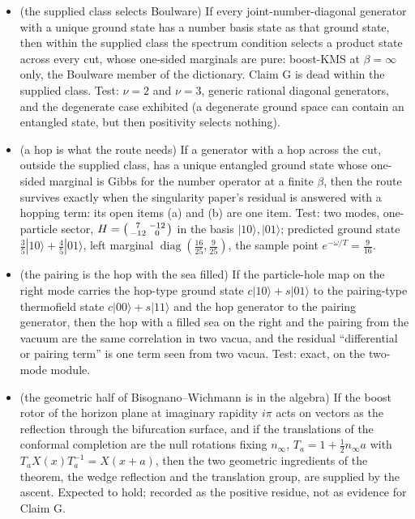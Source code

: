 \documentclass[11pt]{article}
\theoremstyle{definition}
\theoremstyle{plain}
\providecommand{\nInf}{}\renewcommand{\nInf}{n_\infty}
\providecommand{\ket}{}\renewcommand{\ket}[1]{|#1\rangle}
\begin{document}
\begin{itemize}
\item[K1] (the supplied class selects Boulware) If every joint-number-diagonal generator with a unique ground state has a number basis state as that ground state, then within the supplied class the spectrum condition selects a product state across every cut, whose one-sided marginals are pure: boost-KMS at $\beta = \infty$ only, the Boulware member of the dictionary. Claim G is dead within the supplied class. Test: $\nu = 2$ and $\nu = 3$, generic rational diagonal generators, and the degenerate case exhibited (a degenerate ground space can contain an entangled state, but then positivity selects nothing).
\item[K2] (a hop is what the route needs) If a generator with a hop across the cut, outside the supplied class, has a unique entangled ground state whose one-sided marginal is Gibbs for the number operator at a finite $\beta$, then the route survives exactly when the singularity paper's residual is answered with a hopping term: its open items (a) and (b) are one item. Test: two modes, one-particle sector, $H = \begin{psmallmatrix} 7 & -12 \\ -12 & 0\end{psmallmatrix}$ in the basis $\ket{10}, \ket{01}$; predicted ground state $\tfrac35\ket{10} + \tfrac45\ket{01}$, left marginal $\operatorname{diag}(\tfrac{16}{25}, \tfrac{9}{25})$, the sample point $e^{-\omega/T} = \tfrac{9}{16}$.
\item[K3] (the pairing is the hop with the sea filled) If the particle-hole map on the right mode carries the hop-type ground state $c\ket{10} + s\ket{01}$ to the pairing-type thermofield state $c\ket{00} + s\ket{11}$ and the hop generator to the pairing generator, then the hop with a filled sea on the right and the pairing from the vacuum are the same correlation in two vacua, and the residual ``differential or pairing term'' is one term seen from two vacua. Test: exact, on the two-mode module.
\item[K4] (the geometric half of Bisognano--Wichmann is in the algebra) If the boost rotor of the horizon plane at imaginary rapidity $i\pi$ acts on vectors as the reflection through the bifurcation surface, and if the translations of the conformal completion are the null rotations fixing $\nInf$, $T_{a} = 1 + \tfrac12\nInf a$ with $T_{a}X(x)T_{a}^{-1} = X(x + a)$, then the two geometric ingredients of the theorem, the wedge reflection and the translation group, are supplied by the ascent. Expected to hold; recorded as the positive residue, not as evidence for Claim G.

\end{itemize}
\end{document}
